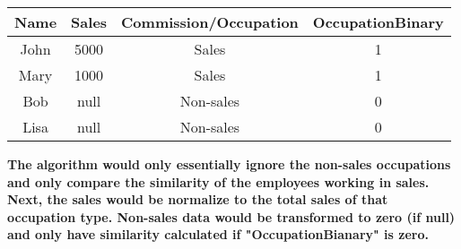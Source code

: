 \documentclass{article}
\begin{document}
\begin{itemize}
\begin{itemize}
\begin{center}
\begin{tabular}{|c|c|c|c|}
            Name & Sales & Commission/Occupation & OccupationBinary\\
            \hline
            John & 5000 & Sales & 1 \\
            \hline
            Mary & 1000 & Sales & 1 \\
            \hline
            Bob & null & Non-sales & 0\\
            \hline
            Lisa & null & Non-sales & 0\\
            \hline
            \end{tabular}
        \end{center}
        \textbf{The algorithm would only essentially ignore the non-sales occupations and only compare the similarity of the employees working in sales. Next, the sales would be normalize to the total sales of that occupation type.  Non-sales data would be transformed to zero (if null) and only have similarity calculated if "OccupationBianary" is zero. }
    \end{itemize}
\end{itemize}
\end{document}
